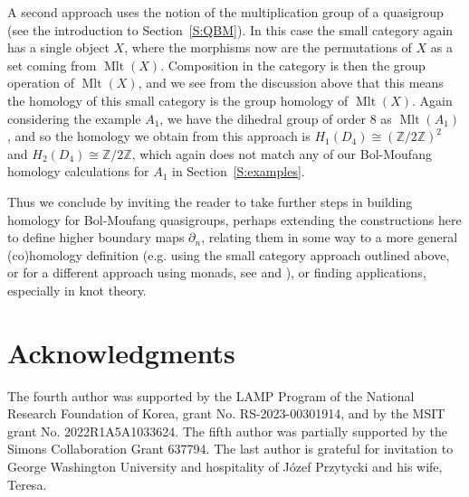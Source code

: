 \documentclass[11pt]{amsart}
\theoremstyle{definition}
\newcommand{\Z}{\mathbb{Z}}
\newcommand{\Mlt}{\mathop{\mathrm{Mlt}}}
\begin{document}
A second approach uses the notion of the multiplication group of a quasigroup (see the introduction to Section~\ref{S:QBM}). In this case the small category again has a single object $X$, where the morphisms now are the permutations of $X$ as a set coming from $\Mlt(X)$. Composition in the category is then the group operation of $\Mlt(X)$, and we see from the discussion above that this means the homology of this small category is the group homology of $\Mlt(X)$. Again considering the example $A_1$, we have the dihedral group of order 8 as $\Mlt(A_1)$, and so the homology we obtain from this approach is $H_1(D_4) \cong (\Z/2\Z)^2$ and $H_2(D_4) \cong \Z/2\Z$, which again does not match any of our Bol-Moufang homology calculations for $A_1$ in Section~\ref{S:examples}. 

\vspace{1em}

Thus we conclude by inviting the reader to take further steps in building homology for Bol-Moufang quasigroups, perhaps extending the constructions here to define higher boundary maps $\partial_n$, relating them in some way to a more general (co)homology definition (e.g. using the small category approach outlined above, or for a different approach using monads, see \cite{Dus} and \cite{Smi1}), or finding applications, especially in knot theory.



\section{Acknowledgments}
The fourth author was supported by the LAMP Program of the National Research Foundation of Korea, grant No. RS-2023-00301914, and by the MSIT grant No. 2022R1A5A1033624. The fifth author was partially supported by the Simons Collaboration Grant 637794. The last author is grateful for invitation to George Washington University and hospitality of J\'ozef Przytycki and his wife, Teresa. 
\end{document}
